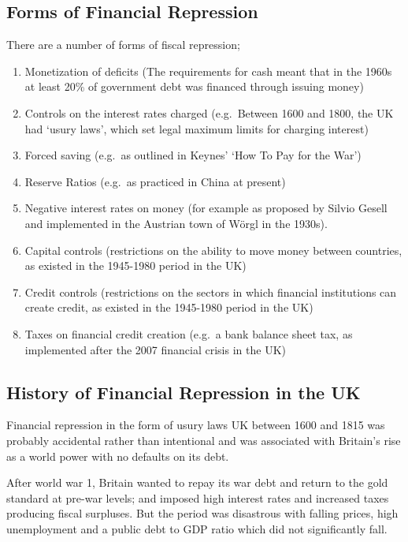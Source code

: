 \documentclass[]{tufte-handout}
\providecommand{\tightlist}{%
  \setlength{\itemsep}{0pt}\setlength{\parskip}{0pt}}
\begin{document}
\hypertarget{forms-of-financial-repression}{%
\subsection{Forms of Financial
Repression}\label{forms-of-financial-repression}}

There are a number of forms of fiscal repression;

\begin{enumerate}
\def\labelenumi{\arabic{enumi}.}
\tightlist
\item
  Monetization of deficits (The requirements for cash meant that in the
  1960s at least 20\% of government debt was financed through issuing
  money)
\item
  Controls on the interest rates charged (e.g.~Between 1600 and 1800,
  the UK had `usury laws', which set legal maximum limits for charging
  interest)
\item
  Forced saving (e.g.~as outlined in Keynes' `How To Pay for the War')
\item
  Reserve Ratios (e.g.~as practiced in China at present)
\item
  Negative interest rates on money (for example as proposed by Silvio
  Gesell and implemented in the Austrian town of Wörgl in the 1930s).
\item
  Capital controls (restrictions on the ability to move money between
  countries, as existed in the 1945-1980 period in the UK)
\item
  Credit controls (restrictions on the sectors in which financial
  institutions can create credit, as existed in the 1945-1980 period in
  the UK)
\item
  Taxes on financial credit creation (e.g.~a bank balance sheet tax, as
  implemented after the 2007 financial crisis in the UK)
\end{enumerate}

\hypertarget{history-of-financial-repression-in-the-uk}{%
\subsection{History of Financial Repression in the
UK}\label{history-of-financial-repression-in-the-uk}}

Financial repression in the form of usury laws UK between 1600 and 1815
was probably accidental rather than intentional and was associated with
Britain's rise as a world power with no defaults on its debt.

After world war 1, Britain wanted to repay its war debt and return to
the gold standard at pre-war levels; and imposed high interest rates and
increased taxes producing fiscal surpluses. But the period was
disastrous with falling prices, high unemployment and a public debt to
GDP ratio which did not significantly fall.
\end{document}
